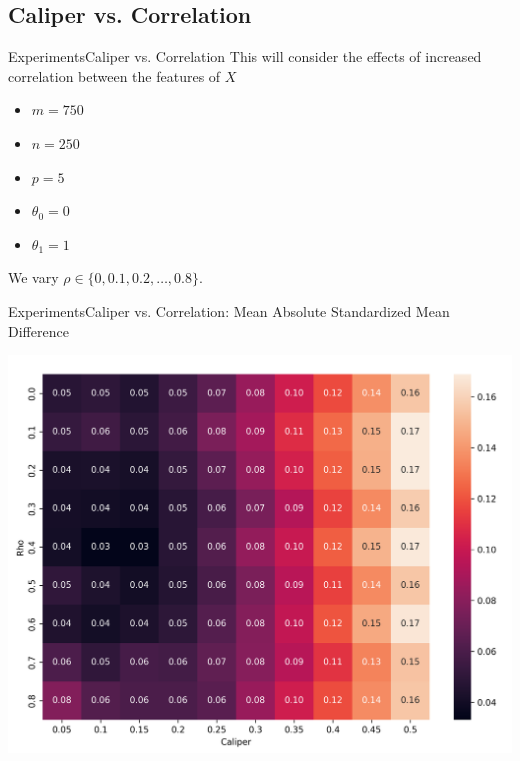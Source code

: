 \documentclass[11pt, compress]{beamer}
\begin{document}
\subsection{Caliper vs. Correlation}
\begin{frame}{Experiments}{Caliper vs. Correlation}
	This will consider the effects of increased correlation between the features of $X$
	\begin{itemize}
		\item $m = 750$
		\item $n = 250$
		\item $p = 5$
		\item $\theta_0 = 0$
		\item $\theta_1 = 1$
	\end{itemize}
	We vary $\rho \in \{0, 0.1, 0.2, \ldots, 0.8\}$.
\end{frame}
\begin{frame}{Experiments}{Caliper vs. Correlation: Mean Absolute Standardized Mean Difference}
	\begin{center}
		\includegraphics[width=\textwidth]{../paper/img/output30/caliper_vs_correlation_big/plots/rho_caliper_mean_abs_smd.png}
	\end{center}
\end{frame}
\end{document}
